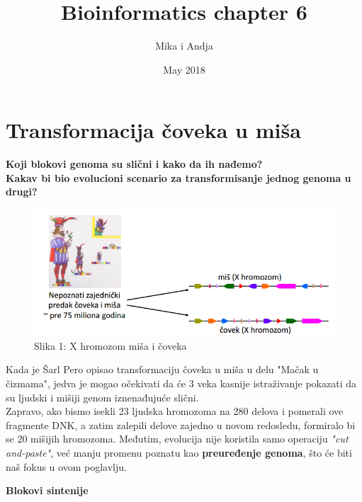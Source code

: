 \documentclass{article}
\title{Bioinformatics chapter 6}
\author{Mika i Andja }
\date{May 2018}
\begin{document}
\maketitle
\newpage

\section{Transformacija čoveka u miša}

\vspace{0.5cm}

\noindent \textbf{Koji blokovi genoma su slični i kako da ih
nađemo?}\\

\noindent \textbf{Kakav bi bio evolucioni scenario za
transformisanje jednog genoma u drugi?}\\

\begin{figure}[h!]
\includegraphics[scale=0.7]{slike/predak_X.PNG}
\caption{Slika 1: X hromozom miša i čoveka}
\label{slika:X}
\end{figure}

Kada je Šarl Pero opisao transformaciju čoveka u miša u delu "Mačak u čizmama", jedva je mogao očekivati da će 3 veka kasnije istraživanje pokazati da su ljudski i mišiji genom iznenađujuće slični.\\

Zapravo, ako bismo isekli 23 ljudska hromozoma na 280 delova i pomerali ove fragmente DNK, a zatim zalepili delove zajedno u novom redosledu, formiralo bi se 20 mišijih hromozoma. Međutim, evolucija nije koristila samo operaciju \textit{"cut and-paste"}, već manju promenu poznatu kao \textbf{preuređenje genoma}, što će biti naš  fokus u ovom poglavlju.\\

\newpage

\hspace{4cm}\large{\textbf{Blokovi sintenije}}\\
\end{document}
